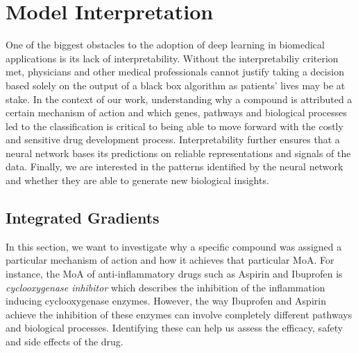 \documentclass[bsc,frontabs,twoside,singlespacing,parskip,deptreport]{infthesis}     %
\let\Oldsection\section
\renewcommand{\section}{\FloatBarrier\Oldsection}
\begin{document}
\chapter{Model Interpretation}
One of the biggest obstacles to the adoption of deep learning in biomedical applications is its lack of interpretability. Without the interpretabiliy criterion met, physicians and other medical professionals cannot justify taking a decision based solely on the output of a black box algorithm as patients' lives may be at stake. In the context of our work, understanding why a compound is attributed a certain mechanism of action and which genes, pathways and biological processes led to the classification is critical to being able to move forward with the costly and sensitive drug development process. Interpretability further ensures that a neural network bases its predictions on reliable representations and signals of the data. Finally, we are interested in the patterns identified by the neural network and whether they are able to generate new biological insights.

\section{Integrated Gradients}
In this section, we want to investigate why a specific compound was assigned a particular mechanism of action and how it achieves that particular MoA.
For instance, the MoA of anti-inflammatory drugs such as Aspirin and Ibuprofen is \textit{cyclooxygenase inhibitor} which describes the inhibition of the inflammation inducing cyclooxygenase enzymes. However, the way Ibuprofen and Aspirin achieve the inhibition of these enzymes can involve completely different pathways and biological processes. Identifying these can help us assess the efficacy, safety and side effects of the drug.
\end{document}

